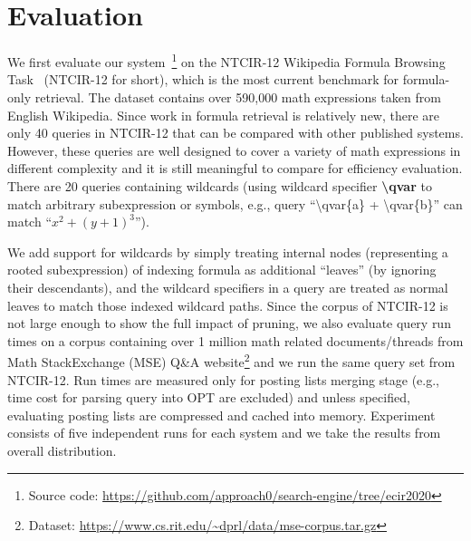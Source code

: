 \documentclass[runningheads]{llncs}
\begin{document}
\section{Evaluation}
We first evaluate our system~\footnote{Source code: \url{https://github.com/approach0/search-engine/tree/ecir2020}} on the NTCIR-12 Wikipedia Formula Browsing Task~\cite{ntcir12} (NTCIR-12 for short), which is the most current benchmark for formula-only retrieval.
The dataset contains over 590,000 math expressions taken from English Wikipedia.
%
Since work in formula retrieval is relatively new, there are only 40 queries in NTCIR-12 that can be compared with other published systems. However, these queries are well designed to cover a variety of math expressions in different complexity and it is still meaningful to compare for efficiency evaluation. There are 20 queries containing wildcards (using wildcard specifier \textbf{\textbackslash{}qvar} to match arbitrary subexpression or symbols, e.g., query ``\textbackslash qvar\{a\} + \textbackslash qvar\{b\}'' can match ``$x^2 + (y + 1)^3$'').

We add support for wildcards by simply treating internal nodes (representing a rooted subexpression) of indexing formula as additional ``leaves'' (by ignoring their descendants), and the wildcard specifiers in a query are treated as normal leaves to match those indexed wildcard paths.
Since the corpus of NTCIR-12 is not large enough to show the full impact of pruning, we also evaluate query run times on a corpus containing over 1 million math related documents/threads from Math StackExchange (MSE) Q\&A website\footnote{Dataset: \url{https://www.cs.rit.edu/~dprl/data/mse-corpus.tar.gz}} and we run the same query set from NTCIR-12.
%
Run times are measured only for posting lists merging stage (e.g., time cost for parsing query into OPT are excluded) and unless specified, evaluating posting lists are compressed and cached into memory.
%
Experiment consists of five independent runs for each system and we take the results from overall distribution.
\end{document}
